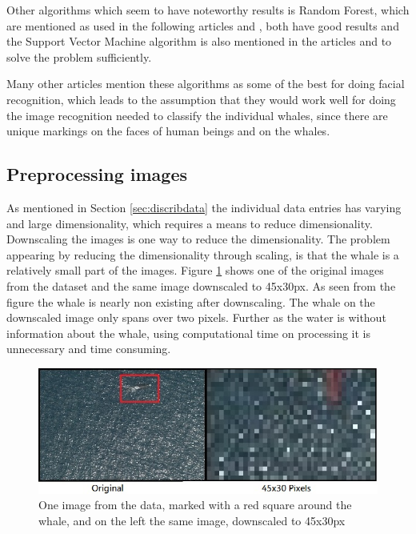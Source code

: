 Other algorithms which seem to have noteworthy results is Random Forest, which are mentioned as used in the following articles \cite{lit:rn1} and \cite{lit:rn2}, both have good results and the Support Vector Machine algorithm is also mentioned in the articles \cite{lit:svm1} and \cite{lit:svm2} to solve the problem sufficiently.

Many other articles mention these algorithms as some of the best for doing facial recognition, which leads to the assumption that they would work well for doing the image recognition needed to classify the individual whales, since there are unique markings on the faces of human beings and on the whales.





\subsection{Preprocessing images}
\label{sec:litterature}
As mentioned in Section \ref{sec:discribdata} the individual data entries has varying and large dimensionality, which requires a means to reduce dimensionality. 
Downscaling the images is one way to reduce the dimensionality.
The problem appearing by reducing the dimensionality through scaling, is that the whale is a relatively small part of the images. Figure \ref{fig:scale} shows one of the original images from the dataset and the same image downscaled to 45x30px. As seen from the figure the whale is nearly non existing after downscaling. The whale on the downscaled image only spans over two pixels.
Further as the water is without information about the whale, using computational time on processing it is unnecessary and time consuming.

\begin{figure}
	\centering
	\includegraphics[width=\linewidth]{Images/scale}
	\caption{One image from the data, marked with a red square around the whale, and on the left the same image, downscaled to 45x30px}
\label{fig:scale}
\end{figure}

